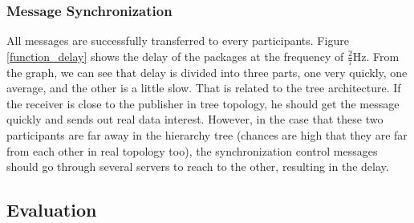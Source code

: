 \documentclass[conference]{IEEEtran}
\begin{document}
\subsubsection{Message Synchronization}
All messages are successfully transferred to every participants.
Figure \ref{function_delay} shows the delay of the packages at the frequency of $\frac{2}{7}$Hz.
From the graph, we can see that delay is divided into three parts,
one very quickly, one average, and the other is a little slow.
That is related to the tree architecture.
If the receiver is close to the publisher in tree topology,
he should get the message quickly and sends out real data interest.
However, in the case that these two participants are far away in the hierarchy tree
(chances are high that they are far from each other in real topology too),
the synchronization control messages should go through several servers to reach to the other,
resulting in the delay.

\subsection{Evaluation}
\end{document}
